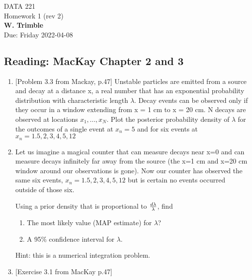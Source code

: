 \documentclass[12pt]{book}
\theoremstyle{definition}
\begin{document}
\begin{center}
{\Large DATA 221 \\  Homework 1  (rev 2)}\\
\textbf{W. Trimble}\\ %
Due: Friday 2022-04-08 
\end{center}

\vspace{0.2 cm}

\subsection*{Reading:  MacKay Chapter 2 and 3}

\begin{enumerate}
\item\label{cheese}
[Problem 3.3 from Mackay, p.47]
Unstable particles are emitted from a source and decay at a distance x, a real number that has an exponential probability distribution with characteristic length $\lambda $. Decay events can be observed only if they occur in a window extending from x = 1 cm to x = 20 cm. N decays are observed at locations ${x_1, . . . , x_N }$. Plot the posterior probability density of $\lambda$ for the outcomes of a single event at  ${x_n} =  {5}$   and for six events at ${x_n} =  {1.5,2,3,4,5,12}$ 



\item\label{breaths}
Let us imagine a magical counter that can measure decays near x=0 and can measure decays infinitely far away from the source (the x=1 cm and x=20 cm window around our observations is gone).  Now our counter has observed the same six events, ${x_n} =  {1.5,2,3,4,5,12}$ but is certain no events occurred outside of those six. 

Using a prior density that is proportional to ${d\lambda }\over {\lambda}$, find 
\begin{enumerate}
\item	The most likely value (MAP estimate) for $\lambda$? 
\item   A 95\% confidence interval for $\lambda$.
\end{enumerate}

Hint: this is a numerical integration problem.

\item\label{toscientific}
[Exercise 3.1 from MacKay p.47] 


\end{enumerate}
\end{document}
